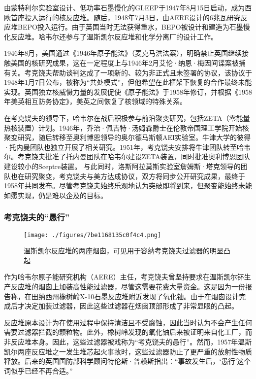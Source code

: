 由蒙特利尔实验室设计、低功率石墨慢化的GLEEP于1947年8月15日启动，成为西欧首座投入运行的核反应堆。随后，1948年7月3日，由AERE设计的6兆瓦研究反应堆BEPO投入运行。由于英国当时无法获得重水，BEPO被设计和建造为石墨慢化反应堆。哈韦尔还参与了温斯凯尔反应堆和化学分离厂的设计工作。

1946年8月，美国通过《1946年原子能法》（麦克马洪法案），明确禁止英国继续接触美国的核研究成果，这在一定程度上与1946年2月艾伦·纳恩·梅因间谍案被捕有关。考克饶夫帮助谈判达成了一项新的、较为非正式且未签署的协议，该协议于1948年1月7日公布，被称为“共处模式”，但他希望在此框架下恢复的合作最终未能实现。英国独立核威慑力量的发展促使《原子能法》于1958年修订，并根据《1958年美英相互防务协定》，美英之间恢复了核领域的特殊关系。

在考克饶夫的领导下，哈韦尔在战后积极参与前沿聚变研究，包括ZETA（零能量热核装置）计划。1946年，乔治·佩吉特·汤姆森爵士在伦敦帝国理工学院开始核聚变研究，随后转移至奥利博恩领导的奥尔德马斯顿AEI实验室。牛津大学的彼得·托内曼团队也独立开展了相关研究。1951年，考克饶夫安排将牛津团队转至哈韦尔。考克饶夫批准了托内曼团队在哈韦尔建设ZETA装置，同时批准奥利博恩团队建设较小的Sceptre装置。
与此同时，洛斯阿拉莫斯实验室詹姆斯·塔克领导的团队也在研究聚变，考克饶夫与美方达成协议，双方将同步公开研究成果，最终于1958年共同发布。尽管考克饶夫始终乐观地认为突破即将到来，但聚变能始终未能如愿实现，仍是难以企及的目标。
\subsubsection{考克饶夫的“愚行”}
\begin{figure}[ht]
\centering
\texttt{[image: ./figures/7be1168135c0f4c4.png]}
\caption{温斯凯尔反应堆的两座烟囱，可见用于容纳考克饶夫过滤器的明显凸起} \label{fig_YHkrf_7}
\end{figure}
作为哈韦尔原子能研究机构（AERE）主任，考克饶夫曾坚持要求在温斯凯尔钚生产反应堆的烟囱上加装高性能过滤器，尽管这需要花费大量资金。这是因为一份报告称，在田纳西州橡树岭X-10石墨反应堆附近发现了氧化铀。由于在烟囱设计完成后才决定加装过滤器，因此这些过滤器在烟囱顶部形成了非常显眼的凸起。

反应堆原本设计为在使用过程中保持清洁且不受腐蚀，因此当时认为不会产生任何需要过滤器拦截的颗粒物。此外，橡树岭发现的氧化铀后来被证明来自化工厂，而非反应堆本身。因此，这些过滤器被戏称为“考克饶夫的愚行”。然而，1957年温斯凯尔两座反应堆之一发生堆芯起火事故时，这些过滤器防止了更严重的放射性物质释放。后来的英国国防部科学顾问特伦斯·普赖斯指出：“事故发生后，‘愚行’这个词似乎已经不再合适。”
